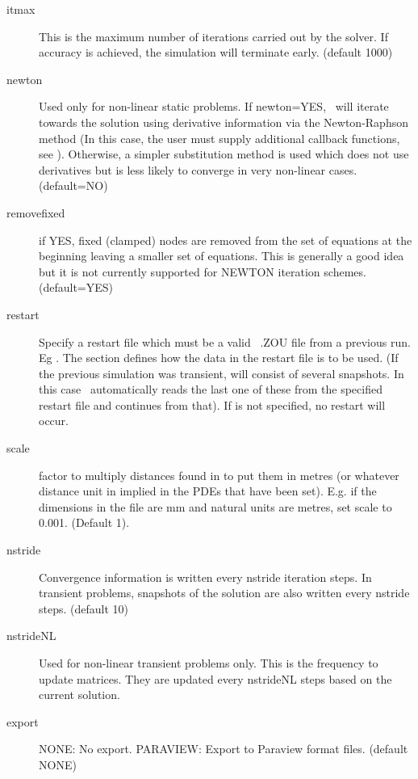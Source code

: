 \documentclass[a4paper,twoside,11pt]{book}
\begin{document}
\begin{description}
\item[itmax] This is the maximum number of iterations carried out by
  the solver. If  accuracy is achieved, the simulation will
  terminate early. (default 1000)

\item[newton] Used only for non-linear static problems. If newton=YES,
  \zinc\ will iterate towards the solution using derivative
  information via the Newton-Raphson method (In this case, the user
  must supply additional callback functions, see ). Otherwise, a
  simpler substitution method is used which does not use derivatives but is less
  likely to converge in very non-linear cases. (default=NO)

\item[removefixed] if YES, fixed (clamped) nodes are removed from the
  set of equations at the beginning leaving a smaller set of
  equations. This is generally a good idea but it is not currently
  supported for NEWTON iteration schemes. (default=YES)

\item[restart] Specify a restart file which must be a valid
  \zinc\ .ZOU file from a previous run. Eg
  . The  section 
  defines how the data in the restart file is to be used. (If the
  previous simulation was transient,  will consist
  of several snapshots. In this case \zinc\ automatically reads the
  last one of these from the specified restart file and continues from
  that). If  is not specified, no restart will occur.

\item[scale] factor to multiply distances found in  to
  put them in metres (or whatever distance unit in implied in the PDEs
  that have been set). E.g. if the dimensions in the 
  file are mm and natural units are metres, set scale to
  0.001. (Default 1).

\item[nstride] Convergence information is written every nstride
  iteration steps. In transient problems, snapshots of the solution
  are also written every nstride steps. (default 10)

\item[nstrideNL] Used for non-linear transient problems only. This is
  the frequency to update matrices. They are updated every nstrideNL
  steps based on the current solution.

\item[export] NONE: No export. PARAVIEW: Export to Paraview format
   files. (default NONE)


\end{description}
\end{document}
